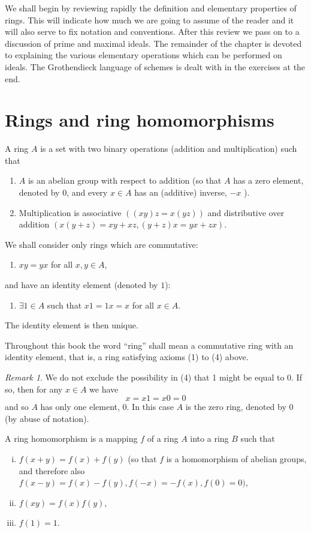\documentclass[class=book, crop=false]{standalone}
\theoremstyle{definition}
\theoremstyle{remark}
\newtheorem*{remark}{Remark}
\begin{document}
We shall begin by reviewing rapidly the definition and elementary properties of
rings. This will indicate how much we are going to assume of the reader and it
will also serve to fix notation and conventions. After this review we pass on to
a discussion of prime and maximal ideals. The remainder of the chapter is
devoted to explaining the various elementary operations which can be performed
on ideals. The Grothendieck language of schemes is dealt with in the exercises
at the end.

\section{Rings and ring homomorphisms}
A ring $A$ is a set with two binary operations (addition and multiplication)
such that

\begin{enumerate}
  \item $A$ is an abelian group with respect to addition (so that $A$ has a zero
        element, denoted by $0$, and every $x \in A$ has an (additive) inverse,
        $-x$ ).
  \item Multiplication is associative $((x y) z=x(y z))$ and distributive over
        addition $(x(y+z)=x y+x z,(y+z) x=y x+z x)$.
\end{enumerate}
We shall consider only rings which are commutative:
\begin{enumerate}[resume*]
  \item $x y=y x$ for all $x, y \in A$,
\end{enumerate}
and have an identity element (denoted by $1$):
\begin{enumerate}[resume*]
  \item $\exists 1 \in A$ such that $x 1=1 x=x$ for all $x \in A$.
\end{enumerate}

The identity element is then unique.

Throughout this book the word ``ring'' shall mean a commutative ring with an
identity element, that is, a ring satisfying axioms (1) to (4) above.
\begin{remark}
  We do not exclude the possibility in (4) that 1 might be equal to $0$. If so,
  then for any $x \in A$ we have
  \[
    x=x 1=x 0=0
  \]
  and so $A$ has only one element, $0$. In this case $A$ is the zero ring,
  denoted by $0$ (by abuse of notation).
\end{remark}

A ring homomorphism is a mapping $f$ of a ring $A$ into a ring $B$ such that
\begin{enumerate}[i)]
  \item $f(x+y)=f(x)+f(y)$ (so that $f$ is a homomorphism of abelian groups, and
        therefore also $f(x-y)=f(x)-f(y), f(-x)=-f(x), f(0)=0)$,
  \item $f(x y)=f(x) f(y)$,
  \item $f(1)=1$.

\end{enumerate}
\end{document}
